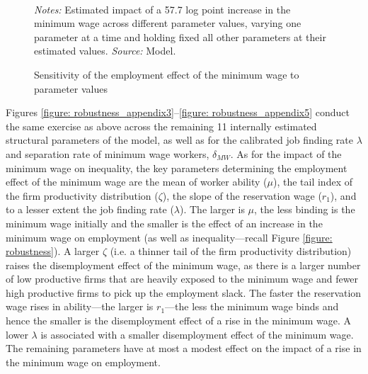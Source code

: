 \begin{figure}[!htb]
  \centering
  \caption{Sensitivity of the employment effect of the minimum wage to parameter values\label{figure: robustness employment}}
  \prefigvspace
  \\
  \postfigvspace
  \begin{minipage}[t]{1\columnwidth}%
    \begin{spacing}{0.75}
      \emph{\scriptsize{}Notes: }{\scriptsize{} Estimated impact of a 57.7 log point increase in the minimum wage across different parameter values, varying one parameter at a time and holding fixed all other parameters at their estimated values.
      \emph{\scriptsize{}Source: } Model.}
    \end{spacing}
  \end{minipage}
\end{figure}



Figures \ref{figure: robustness_appendix3}--\ref{figure: robustness_appendix5} conduct the same exercise as above across the remaining 11 internally estimated structural parameters of the model, as well as for the calibrated job finding rate $\lambda$ and separation rate of minimum wage workers, $\delta_{MW}$. As for the impact of the minimum wage on inequality, the key parameters determining the employment effect of the minimum wage are the mean of worker ability ($\mu$), the tail index of the firm productivity distribution ($\zeta$), the slope of the reservation wage ($r_1$), and to a lesser extent the job finding rate ($\lambda$). The larger is $\mu$, the less binding is the minimum wage initially and the smaller is the effect of an increase in the minimum wage on employment (as well as inequality---recall Figure \ref{figure: robustness}). A larger $\zeta$ (i.e. a thinner tail of the firm productivity distribution) raises the disemployment effect of the minimum wage, as there is a larger number of low productive firms that are heavily exposed to the minimum wage and fewer high productive firms to pick up the employment slack. The faster the reservation wage rises in ability---the larger is $r_1$---the less the minimum wage binds and hence the smaller is the disemployment effect of a rise in the minimum wage. A lower $\lambda$ is associated with a smaller disemployment effect of the minimum wage. The remaining parameters have at most a modest effect on the impact of a rise in the minimum wage on employment.

